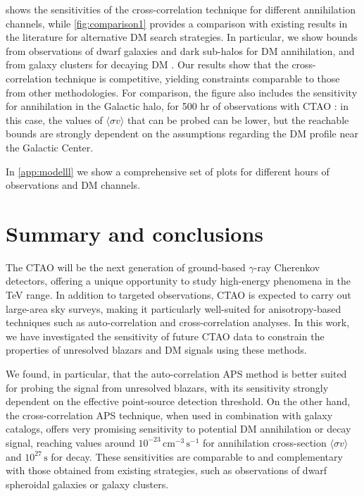 \documentclass[aps,prd,a4paper,reprint,nofootinbib,superscriptaddress,floatfix,preprintnumbers]{revtex4-2}
\begin{document}
 shows the sensitivities of the cross-correlation technique for different annihilation channels, while \cref{fig:comparison1} provides a comparison with existing results in the literature for alternative DM search strategies. In particular, we show bounds from observations of dwarf galaxies \cite{CTAConsortium:2017dvg} and dark sub-halos \cite{Coronado_Blazquez_2021} for DM annihilation, and from galaxy clusters for decaying DM \cite{CTA2023,MAGIC_2018,Huang_2012,Cirelli_2012}. Our results show that the cross-correlation technique is competitive, yielding constraints comparable to those from other methodologies. For comparison, the figure also includes the sensitivity for annihilation in the Galactic halo, for 500 hr of observations with CTAO \cite{CTAConsortium:2017dvg}: in this case, the values of $\langle \sigma v \rangle$ that can be probed can be lower, but the reachable bounds are strongly dependent on the assumptions regarding the DM profile near the Galactic Center.

In {\cref{app:modelll}} we show a comprehensive set of plots for different hours of observations and DM channels. 



\section{Summary and conclusions}\label{sec:conclusions}

The CTAO will be the next generation of ground-based $\gamma$-ray Cherenkov detectors, offering a unique opportunity to study high-energy phenomena in the TeV range.  In addition to targeted observations, CTAO is expected to carry out large-area sky surveys, making it particularly well-suited for anisotropy-based techniques such as auto-correlation and cross-correlation analyses.
In this work, we have investigated the sensitivity of future CTAO data to constrain the properties of unresolved blazars and DM signals using these methods.

We found, in particular, that the auto-correlation APS method is better suited for probing the signal from unresolved blazars, with its sensitivity strongly dependent on the effective {point-}source detection threshold. On the other hand, the cross-correlation APS technique, when used in combination with galaxy catalogs, offers very promising sensitivity to potential DM annihilation or decay signal, reaching values around $10^{-23}\,\mathrm{cm^{-3}\,s^{-1}}$ for annihilation cross-section $\langle \sigma v \rangle$ and $10^{27}\,\mathrm{s}$ for decay.
These sensitivities are comparable to and complementary with those obtained from existing strategies, such as observations of dwarf spheroidal galaxies or galaxy clusters.
\end{document}
